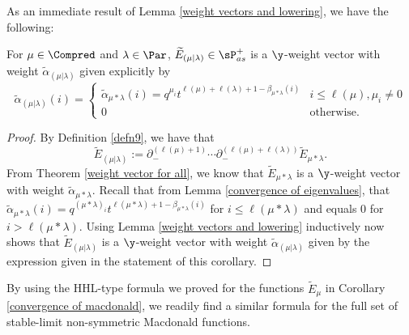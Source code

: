 As an immediate result of Lemma \ref{weight vectors and lowering}, we have the following:
\begin{coro}\label{stable macdonald are weight vectors}
    For $\mu \in \Compred$ and $\lambda \in \Par$,  $\widetilde{E}_{(\mu|\lambda)} \in \sP_{as}^{+}$ is a $\y$-weight vector with weight $\widetilde{\alpha}_{(\mu|\lambda)}$ given explicitly by
\begin{equation}
    \widetilde{\alpha}_{(\mu|\lambda)}(i) = 
    \begin{cases}
    \widetilde{\alpha}_{\mu*\lambda}(i) = q^{\mu_i}t^{\ell(\mu)+\ell(\lambda)+1-\beta_{\mu*\lambda}(i)} & i\leq \ell(\mu) , \mu_i \neq 0 \\
    0 & \text{otherwise}.
     \end{cases}
\end{equation}
\end{coro}
\begin{proof}
   By Definition \ref{defn9}, we have that $$\widetilde{E}_{(\mu|\lambda)} :=  \partial_{-}^{(\ell(\mu)+1)}\cdots \partial_{-}^{(\ell(\mu)+\ell(
\lambda))} \widetilde{E}_{\mu*\lambda}. $$
From Theorem \ref{weight vector for all}, we know that $\widetilde{E}_{\mu*\lambda}$ is a $\y$-weight vector with weight $\widetilde{\alpha}_{\mu*\lambda}.$ Recall that from Lemma \ref{convergence of eigenvalues}, that $\widetilde{\alpha}_{\mu*\lambda}(i) = q^{(\mu*\lambda)_i}t^{\ell(\mu*\lambda)+1-\beta_{\mu*\lambda}(i)}$ for $i \leq \ell(\mu*\lambda)$ and equals $0$ for $i > \ell(\mu*\lambda).$ Using Lemma \ref{weight vectors and lowering} inductively now shows that $\widetilde{E}_{(\mu|\lambda)}$ is a $\y$-weight vector with weight $\widetilde{\alpha}_{(\mu|\lambda)}$ given by the expression given in the statement of this corollary. 
\end{proof}

By using the HHL-type formula we proved for the functions $\widetilde{E}_{\mu}$ in Corollary \ref{convergence of macdonald}, we readily find a similar formula for the full set of stable-limit non-symmetric Macdonald functions. 


